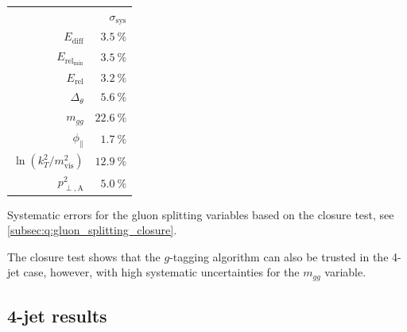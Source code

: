 \begin{margintable}
  \centerfloat
  \begin{tabular}{@{}rr@{}}
  {}                                                & $\sigma_\mathrm{sys}$ \\ \addlinespace[0.1em] \midrule \addlinespace[0.2em]
  $E_\mathrm{diff}$                                 & $\SI{3.5}{\percent}$  \\ \addlinespace[0.2em]
  $E_{\mathrm{rel}_\mathrm{min}}$                   & $\SI{3.5}{\percent}$  \\\addlinespace[0.2em]
  $E_\mathrm{rel}$                                  & $\SI{3.2}{\percent}$  \\\addlinespace[0.2em]
  $\Delta_\theta$                                   & $\SI{5.6}{\percent}$  \\\addlinespace[0.2em]
  $m_{gg}$                                          & $\SI{22.6}{\percent}$ \\\addlinespace[0.2em]
  $\phi_\mathrm{\parallel}$                         & $\SI{1.7}{\percent}$  \\\addlinespace[0.2em]
  $\ln \left( k_T^2 / m_\mathrm{vis}^2 \right)$     & $\SI{12.9}{\percent}$ \\\addlinespace[0.2em]
  $p^2_{\perp,\mathrm{A}}$                          & $\SI{5.0}{\percent}$  \\ %
  \end{tabular}
  \vspace{1mm}
  \caption[Gluon Splitting Systemic Errors]{\label{tab:q:gluon_splitting_systematic_errors}Systematic errors for the gluon splitting variables based on the closure test, see \autoref{subsec:q:gluon_splitting_closure}.}
\end{margintable}


The closure test shows that the $g$-tagging algorithm can also be trusted in the 4-jet case, however, with high systematic uncertainties for the $m_{gg}$ variable. 

\subsection{4-jet results}
\label{subsec:q:gluon_splitting_results}

